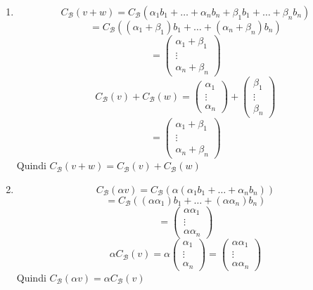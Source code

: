 \documentclass[a4paper]{article}
\theoremstyle{break}
\theoremstyle{break}
\theoremstyle{break}
\theoremstyle{break}
\begin{document}
\begin{enumerate}
  \item \[
      C_{\mathcal{B}}(v+w) = C_{\mathcal{B}}(\alpha_1 b_1 + \ldots + \alpha_n b_n + 
      \beta_1 b_1 + \ldots + \beta_n b_n)
  \] 
  \[
    = C_{\mathcal{B}}((\alpha_1 + \beta_1) b_1 + \ldots + (\alpha_n + \beta_n) b_n)
  \] 
  \[
  = \begin{pmatrix} 
    \alpha_1 + \beta_1\\
    \vdots\\
    \alpha_n + \beta_n
  \end{pmatrix} 
  \] 
  \vspace{1em}
  \[
    C_{\mathcal{B}}(v) + C_{\mathcal{B}}(w) = \begin{pmatrix} 
      \alpha_1\\
      \vdots\\
      \alpha_n
    \end{pmatrix}
    +
    \begin{pmatrix} 
      \beta_1\\
      \vdots\\
      \beta_n
    \end{pmatrix}
  \] 
  \[
  = \begin{pmatrix} 
    \alpha_1 + \beta_1\\
    \vdots\\
    \alpha_n + \beta_n
  \end{pmatrix} 
  \] 
  Quindi \( C_{\mathcal{B}}(v+w) = C_{\mathcal{B}}(v) + C_{\mathcal{B}}(w) \) 

  \item 
    \[
      C_{\mathcal{B}}(\alpha v) = C_{\mathcal{B}}(\alpha(\alpha_1 b_1 + \ldots + \alpha_n b_n))
    \] 
    \[
    = C_{\mathcal{B}}((\alpha \alpha_1) b_1 + \ldots + (\alpha \alpha_n) b_n)
    \] 
    \[
    = \begin{pmatrix} 
      \alpha \alpha_1\\
      \vdots\\
      \alpha \alpha_n
    \end{pmatrix}
    \] 
    \vspace{1em}
    \[
    \alpha C_{\mathcal{B}}(v) = \alpha \begin{pmatrix} 
      \alpha_1\\
      \vdots\\
      \alpha_n
    \end{pmatrix}
    = \begin{pmatrix} 
      \alpha \alpha_1\\
      \vdots\\
      \alpha \alpha_n
    \end{pmatrix}
    \] 
    Quindi \( C_{\mathcal{B}}(\alpha v) = \alpha C_{\mathcal{B}}(v) \)
\end{enumerate}
\end{document}
